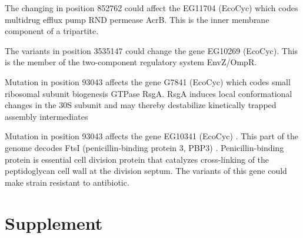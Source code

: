 \documentclass{article}
\begin{document}
The changing in position 852762 could affect the EG11704 (EcoCyc) which codes multidrug efflux pump RND permease AcrB. This is the inner membrane component of a tripartite.

The variants in position 3535147 could change the gene  EG10269 (EcoCyc). This is the member of the two-component regulatory system EnvZ/OmpR.

Mutation in position 93043 affects the gene G7841 (EcoCyc) which codes small ribosomal subunit biogenesis GTPase RsgA. RsgA induces local conformational changes in the 30S subunit and may thereby destabilize kinetically trapped assembly intermediates

Mutation in position 93043 affects the gene EG10341 (EcoCyc) \cite{ecocyc}. This part of the genome decodes FtsI (penicillin-binding protein 3, PBP3) \cite{uniprot}. Penicillin-binding protein is essential cell division protein that catalyzes cross-linking of the peptidoglycan cell wall at the division septum. The variants of this gene could make strain resistant to antibiotic.


 \section{Supplement}
\end{document}
